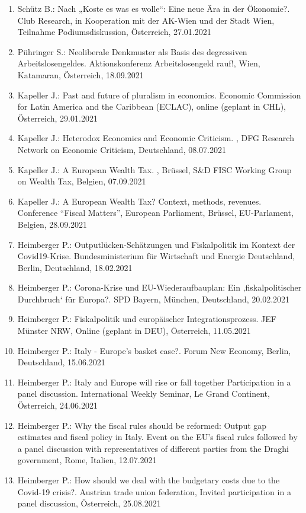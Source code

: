 \begin{enumerate}
	\item Schütz B.: Nach „Koste es was es wolle“: Eine neue Ära in der Ökonomie?. Club Research, in Kooperation mit der AK-Wien und der Stadt Wien, Teilnahme Podiumsdiskussion, Österreich, 27.01.2021
	\item Pühringer S.: Neoliberale Denkmuster als Basis des degressiven Arbeitslosengeldes. Aktionskonferenz Arbeitslosengeld rauf!, Wien, Katamaran, Österreich, 18.09.2021
	\item Kapeller J.: Past and future of pluralism in economics. Economic Commission for Latin America and the Caribbean (ECLAC), online (geplant in CHL), Österreich, 29.01.2021
	\item Kapeller J.: Heterodox Economics and Economic Criticism. , DFG Research Network on Economic Criticism, Deutschland, 08.07.2021
	\item Kapeller J.: A European Wealth Tax. , Brüssel, S\&D FISC Working Group on Wealth Tax, Belgien, 07.09.2021
	\item Kapeller J.: A European Wealth Tax? Context, methods, revenues. Conference “Fiscal Matters”, European Parliament, Brüssel, EU-Parlament, Belgien, 28.09.2021
	\item Heimberger P.: Outputlücken-Schätzungen und Fiskalpolitik im Kontext der Covid19-Krise. Bundesministerium für Wirtschaft und Energie Deutschland, Berlin, Deutschland, 18.02.2021
	\item Heimberger P.: Corona-Krise und EU-Wiederaufbauplan: Ein ‚fiskalpolitischer Durchbruch‘ für Europa?. SPD Bayern, München, Deutschland, 20.02.2021
	\item Heimberger P.: Fiskalpolitik und europäischer Integrationsprozess. JEF Münster NRW, Online (geplant in DEU), Österreich, 11.05.2021
	\item Heimberger P.: Italy - Europe’s basket case?. Forum New Economy, Berlin, Deutschland, 15.06.2021
	\item Heimberger P.: Italy and Europe will rise or fall together Participation in a panel discussion. International Weekly Seminar, Le Grand Continent, Österreich, 24.06.2021
	\item Heimberger P.: Why the fiscal rules should be reformed: Output gap estimates and fiscal policy in Italy. Event on the EU’s fiscal rules followed by a panel discussion with representatives of different parties from the Draghi government, Rome, Italien, 12.07.2021
	\item Heimberger P.: How should we deal with the budgetary costs due to the Covid-19 crisis?. Austrian trade union federation, Invited participation in a panel discussion, Österreich, 25.08.2021

\end{enumerate}
